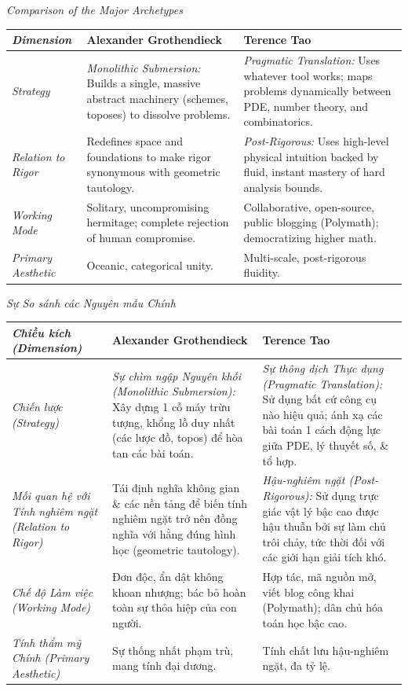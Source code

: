 \documentclass[11pt]{article}
\begin{document}
\emph{Comparison of the Major Archetypes}
\begin{table}[H]
\centering
\begin{tabular}{@{}p{3cm}p{6cm}p{6cm}@{}}
\toprule
\emph{Dimension} & \textbf{Alexander Grothendieck} & \textbf{Terence Tao} \\
\midrule
\emph{Strategy} & \emph{Monolithic Submersion:} Builds a single, massive abstract machinery (schemes, toposes) to dissolve problems. & \emph{Pragmatic Translation:} Uses whatever tool works; maps problems dynamically between PDE, number theory, and combinatorics. \\

\emph{Relation to Rigor} & Redefines space and foundations to make rigor synonymous with geometric tautology. & \emph{Post-Rigorous:} Uses high-level physical intuition backed by fluid, instant mastery of hard analysis bounds. \\

\emph{Working Mode} & Solitary, uncompromising hermitage; complete rejection of human compromise. & Collaborative, open-source, public blogging (Polymath); democratizing higher math. \\

\emph{Primary Aesthetic} & Oceanic, categorical unity. & Multi-scale, post-rigorous fluidity. \\
\bottomrule
\end{tabular}
\end{table}

\emph{Sự So sánh các Nguyên mẫu Chính}
\begin{table}[H]
\centering
\begin{tabular}{@{}p{3cm}p{6cm}p{6cm}@{}}
\toprule
\emph{Chiều kích (Dimension)} & \textbf{Alexander Grothendieck} & \textbf{Terence Tao} \\
\midrule
\emph{Chiến lược (Strategy)} & \emph{Sự chìm ngập Nguyên khối (Monolithic Submersion):} Xây dựng 1 cỗ máy trừu tượng, khổng lồ duy nhất (các lược đồ, topos) để hòa tan các bài toán. & \emph{Sự thông dịch Thực dụng (Pragmatic Translation):} Sử dụng bất cứ công cụ nào hiệu quả; ánh xạ các bài toán 1 cách động lực giữa PDE, lý thuyết số, \& tổ hợp. \\

\emph{Mối quan hệ với Tính nghiêm ngặt (Relation to Rigor)} & Tái định nghĩa không gian \& các nền tảng để biến tính nghiêm ngặt trở nên đồng nghĩa với hằng đúng hình học (geometric tautology). & \emph{Hậu-nghiêm ngặt (Post-Rigorous):} Sử dụng trực giác vật lý bậc cao được hậu thuẫn bởi sự làm chủ trôi chảy, tức thời đối với các giới hạn giải tích khó. \\

\emph{Chế độ Làm việc (Working Mode)} & Đơn độc, ẩn dật không khoan nhượng; bác bỏ hoàn toàn sự thỏa hiệp của con người. & Hợp tác, mã nguồn mở, viết blog công khai (Polymath); dân chủ hóa toán học bậc cao. \\

\emph{Tính thẩm mỹ Chính (Primary Aesthetic)} & Sự thống nhất phạm trù, mang tính đại dương. & Tính chất lưu hậu-nghiêm ngặt, đa tỷ lệ. \\
\bottomrule
\end{tabular}
\end{table}
\end{document}
